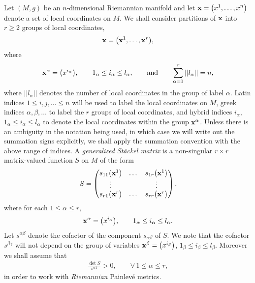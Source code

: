 \documentclass[pdftex]{sigma}
\numberwithin{equation}{section}
\begin{document}
Let $(M,g)$ be an $n$-dimensional Riemannian manifold and let ${\bf x}=\big(x^{1},\dots , x^{n}\big)$ denote a set of local coordinates on $M$. We shall consider partitions of ${\bf x}$ into $r\geq 2$ groups of local coordinates,
\[
{\bf x}=\big({{\bf x}^{1}},\dots,{{\bf x}^{r}}\big),
\]
where
\[
{\bf {x}}^{\alpha}=\big(x^{i_{\alpha}}\big),\qquad 1_{\alpha}\leq i_{\alpha} \leq l_{\alpha},\qquad \text{and}\qquad \sum_{\alpha=1}^{r}||l_{\alpha}||=n,
\]
where $||l_{\alpha}||$ denotes the number of local coordinates in the group of label $\alpha$. Latin indices $1\leq i,j,\ldots \leq n$ will be used to label the local coordinates on $M$, greek indices $\alpha,\beta,\dots$ to label the $r$ groups of local coordinates, and hybrid indices $i_{\alpha}$, $1_{\alpha} \leq i_{\alpha}\leq l_{\alpha}$ to denote the local coordinates within the group $\bf{x^{\alpha}}$. Unless there is an ambiguity in the notation being used, in which case we will write out the summation signs explicitly, we shall apply the summation convention with the above range of indices.
A {\em generalized St\"ackel matrix} is a non-singular $r\times r$ matrix-valued function $S$ on $M$ of the form
\begin{gather}\label{genStackelmat}
S=\left(
\begin{matrix}
s_{11}\big({{\bf x}^{1}}\big)&\dots&s_{1r}\big({{\bf x}^{1}}\big) \\
\vdots& & \vdots \\
s_{r1}\big({{\bf x}^{r}}\big)&\dots&s_{rr}\big({\bf x}^{r}\big)
\end{matrix}
\right),
\end{gather}
where for each $1\leq \alpha \leq r$,
\[
{\bf x}^{\alpha}=\big(x^{i_{\alpha}}\big),\qquad 1_{\alpha}\leq i_{\alpha} \leq l_{\alpha}.
\]
Let $s^{\alpha \beta}$ denote the cofactor of the component $s_{\alpha \beta}$ of $S$. We note that the cofactor $s^{\beta \gamma}$ will not depend on the group of variables ${\bf x}^{\beta}=\big(x^{i_{\beta}}\big)$, $1_{\beta}\leq i_{\beta} \leq l_{\beta}$. Moreover we shall assume that
\begin{gather} \label{StackelPositiveness}
\frac{\det S}{s^{\alpha 1}} > 0, \qquad \forall\, 1\leq \alpha \leq r ,
\end{gather}
in order to work with {\emph{Riemannian}} Painlev\'e metrics.
\end{document}
